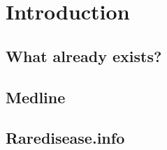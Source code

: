 \section{Introduction}

\subsection{What already exists?}

\subsection{Medline}

\subsection{Raredisease.info}

